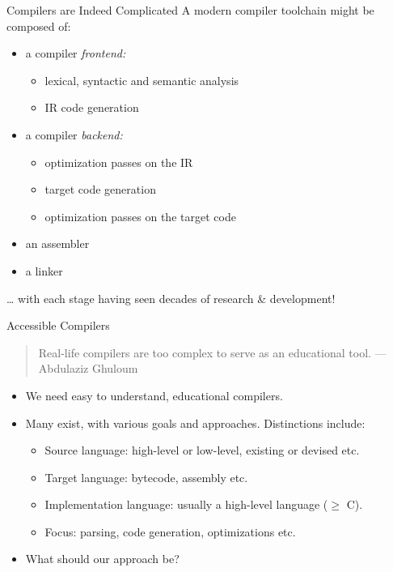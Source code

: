 \documentclass[presentation, bigger]{beamer}
\begin{document}
\begin{frame}[label={sec:orgfc77742}]{Compilers are Indeed Complicated}
A modern compiler toolchain might be composed of:
\begin{itemize}
\item a compiler \emph{frontend:}
\begin{itemize}
\item lexical, syntactic and semantic analysis
\item IR code generation
\end{itemize}
\item a compiler \emph{backend:}
\begin{itemize}
\item optimization passes on the IR
\item target code generation
\item optimization passes on the target code
\end{itemize}
\item an assembler
\item a linker
\end{itemize}

\pause

\dots{} with each stage having seen decades of research \& development!
\end{frame}

\begin{frame}[label={sec:org7e7321c}]{Accessible Compilers}
\begin{quote}
Real-life compilers are too complex to serve as an educational
tool. --- Abdulaziz Ghuloum
\end{quote}

\pause

\begin{itemize}
\item We need easy to understand, educational compilers. \pause
\item Many exist, with various goals and approaches. Distinctions include:
\begin{itemize}
\item Source language: high-level or low-level, existing or devised etc.
\item Target language: bytecode, assembly etc.
\item Implementation language: usually a high-level language (\(\ge\) C).
\item Focus: parsing, code generation, optimizations etc. \pause
\end{itemize}
\item What should our approach be?
\end{itemize}
\end{frame}
\end{document}
